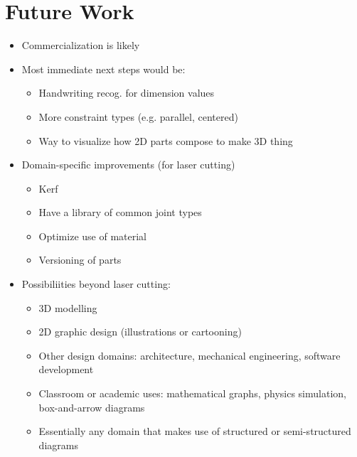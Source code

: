 \section{Future Work}

\begin{itemize}
\item Commercialization is likely
\item Most immediate next steps would be:
  \begin{itemize}
  \item Handwriting recog. for dimension values
  \item More constraint types (e.g. parallel, centered)
  \item Way to visualize how 2D parts compose to make 3D thing
  \end{itemize}
\item Domain-specific improvements (for laser cutting)
  \begin{itemize}
  \item Kerf
  \item Have a library of common joint types
  \item Optimize use of material
  \item Versioning of parts
  \end{itemize}
\item Possibiliities beyond laser cutting:
  \begin{itemize}
  \item 3D modelling
  \item 2D graphic design (illustrations or cartooning)
  \item Other design domains: architecture, mechanical engineering,
    software development
  \item Classroom or academic uses: mathematical graphs, physics
    simulation, box-and-arrow diagrams
  \item Essentially any domain that makes use of structured or
    semi-structured diagrams
  \end{itemize}
\end{itemize}
